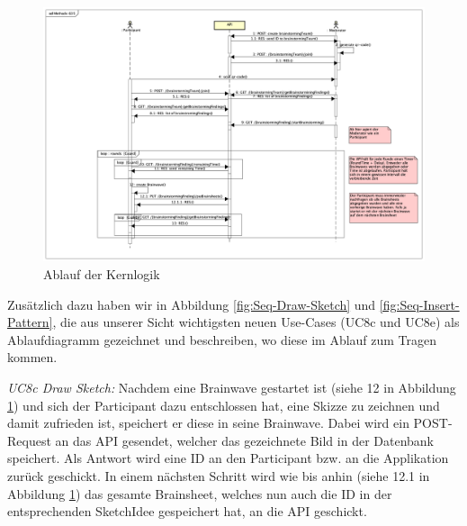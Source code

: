 \begin{figure}[h]
	\centering
	\includegraphics[width=1\linewidth]{img/anforderungen/Seq-Methode635}
	\caption[Ablauf der Kernlogik]{Ablauf der Kernlogik}
	\label{fig:Seq-Methode635}
\end{figure}

Zusätzlich dazu haben wir in Abbildung \ref{fig:Seq-Draw-Sketch} und \ref{fig:Seq-Insert-Pattern}, die aus unserer Sicht wichtigsten neuen Use-Cases (UC8c und UC8e) als Ablaufdiagramm gezeichnet und beschreiben, wo diese im Ablauf zum Tragen kommen.

\begin{basedescript}{
		\desclabelstyle{\multilinelabel}
		\desclabelwidth{4.5cm}
		\setlength{\itemsep}{5ex}}
	
	\item[\textit{UC8c Draw Sketch:}] Nachdem eine Brainwave gestartet ist (siehe 12 in Abbildung \ref{fig:Seq-Methode635}) und sich der Participant dazu entschlossen hat, eine Skizze zu zeichnen und damit zufrieden ist, speichert er diese in seine Brainwave. Dabei wird ein POST-Request an das API gesendet, welcher das gezeichnete Bild in der Datenbank speichert. Als Antwort wird eine ID an den Participant bzw. an die Applikation zurück geschickt.
	In einem nächsten Schritt wird wie bis anhin (siehe 12.1 in Abbildung \ref{fig:Seq-Methode635}) das gesamte Brainsheet, welches nun auch die ID in der entsprechenden SketchIdee gespeichert hat, an die API geschickt.
\end{basedescript}

